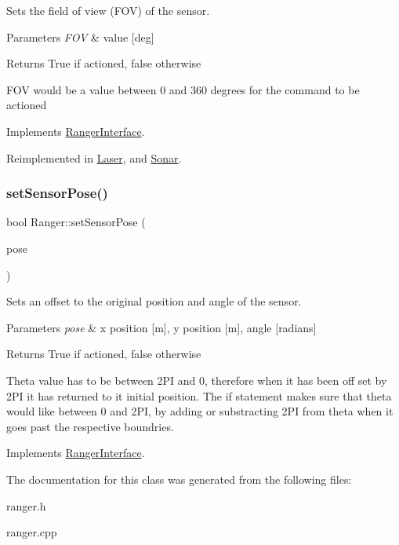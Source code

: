 Sets the field of view (F\+OV) of the sensor. 


\begin{DoxyParams}{Parameters}
{\em F\+OV} & value \mbox{[}deg\mbox{]} \\
\hline
\end{DoxyParams}
\begin{DoxyReturn}{Returns}
True if actioned, false otherwise
\end{DoxyReturn}
F\+OV would be a value between 0 and 360 degrees for the command to be actioned 

Implements \hyperlink{classRangerInterface_a70357ca516198af45e2d503ef6af8f9f}{Ranger\+Interface}.



Reimplemented in \hyperlink{classLaser_a5f140784aae7e82c2aa0f690548d6ebb}{Laser}, and \hyperlink{classSonar_a74d551d0ad61861ccf903f2535d799f0}{Sonar}.

\mbox{\label{classRanger_aa55ad45d83b8c095a495677ac8873f2b}} 
\subsubsection{\texorpdfstring{set\+Sensor\+Pose()}{setSensorPose()}}
{\footnotesize\ttfamily bool Ranger\+::set\+Sensor\+Pose (\begin{DoxyParamCaption}\item[{\hyperlink{structranger_1_1SensorPose}{ranger\+::\+Sensor\+Pose}}]{pose }\end{DoxyParamCaption})\hspace{0.3cm}{\ttfamily [virtual]}}



Sets an offset to the original position and angle of the sensor. 


\begin{DoxyParams}{Parameters}
{\em pose} & x position \mbox{[}m\mbox{]}, y position \mbox{[}m\mbox{]}, angle \mbox{[}radians\mbox{]} \\
\hline
\end{DoxyParams}
\begin{DoxyReturn}{Returns}
True if actioned, false otherwise
\end{DoxyReturn}
Theta value has to be between 2\+PI and 0, therefore when it has been off set by 2\+PI it has returned to it initial position. The if statement makes sure that theta would like between 0 and 2\+PI, by adding or substracting 2\+PI from theta when it goes past the respective boundries. 

Implements \hyperlink{classRangerInterface_a452301937b5ace7ded943d8aa76a061f}{Ranger\+Interface}.



The documentation for this class was generated from the following files\+:\begin{DoxyCompactItemize}
\item 
ranger.\+h\item 
ranger.\+cpp\end{DoxyCompactItemize}
